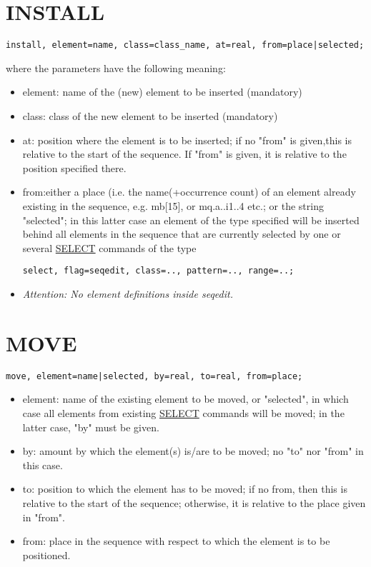 \section{INSTALL}
\begin{verbatim}
install, element=name, class=class_name, at=real, from=place|selected;
\end{verbatim} 
where the parameters have the following meaning: 
\begin{itemize}
   \item element: name of the (new) element to be inserted (mandatory) 
   \item class: class of the new element to be inserted (mandatory) 
   \item at: position where the element is to be inserted; if no "from"
     is given,this is relative to the start of the sequence. If "from"
     is given, it is relative to the position specified there. 
   \item from:either a place (i.e. the name(+occurrence count) of an
     element already existing in the sequence, e.g. mb[15], or
     mq.a..i1..4 etc.; or the string "selected"; in this latter case an
     element of the type specified will be inserted behind all elements
     in the sequence that are currently selected by one or several
     \href{../Introduction/select.html}{SELECT} commands of the type 
\begin{verbatim}
select, flag=seqedit, class=.., pattern=.., range=..;
\end{verbatim} 
   \item \textit{ Attention: No element definitions inside seqedit. }
\end{itemize}


\section{MOVE}
\begin{verbatim}
move, element=name|selected, by=real, to=real, from=place;
\end{verbatim}
\begin{itemize}
   \item element: name of the existing element to be moved, or
     "selected", in which case all elements from existing
     \href{../Introduction/select.html}{SELECT} commands will be moved;
     in the latter case, "by" must be given.  
   \item by: amount by which the element(s) is/are to be moved; no "to"
     nor "from" in this case.  
   \item to: position to which the element has to be moved; if no from,
     then this is relative to the start of the sequence; otherwise, it
     is relative to the place given in "from".  
   \item from: place in the sequence with respect to which the element
     is to be positioned.  
\end{itemize}


